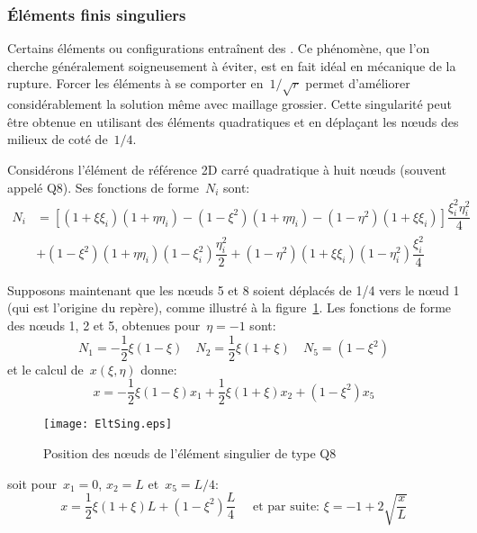 \medskip
\subsubsection{Éléments finis singuliers}
Certains éléments ou configurations entraînent des .
Ce phénomène, que l'on cherche généralement soigneusement à éviter, est en fait idéal en
mécanique de la rupture.
Forcer les éléments à se comporter en~$1/\sqrt{r}$ permet d'améliorer considérablement la solution
même avec maillage grossier.
Cette singularité peut être obtenue en utilisant des éléments quadratiques et en déplaçant
les nœuds des milieux de coté de~$1/4$.

\medskip
Considérons l'élément de référence 2D carré quadratique à huit nœuds (souvent appelé Q8).
Ses fonctions de forme~$N_i$ sont:
\begin{equation} \begin{aligned}
N_i &=\left[ (1+\xi\xi_i)(1+\eta\eta_i)-(1-\xi^2)(1+\eta\eta_i)-(1-\eta^2)(1+\xi\xi_i)\right]
\dfrac{\xi_i^2\eta_i^2}4 \\
& +
(1-\xi^2)(1+\eta\eta_i)(1-\xi_i^2)\dfrac{\eta_i^2}2 +
(1-\eta^2)(1+\xi\xi_i)(1-\eta_i^2)\dfrac{\xi_i^2}4
\end{aligned}\end{equation}

Supposons maintenant que les nœuds 5 et 8 soient déplacés de 1/4 vers le nœud 1 (qui est l'origine
du repère), comme illustré à la figure~\ref{fig-EltSing}.
Les fonctions de forme des nœuds 1, 2 et 5, obtenues pour~$\eta=-1$ sont:
\begin{equation} N_1= -\frac12\xi(1-\xi) \quad
 N_2 = \frac12\xi(1+\xi) \quad
 N_5 = (1-\xi^2)
\end{equation}
et le calcul de~$x(\xi,\eta)$ donne:
\begin{equation} x = -\frac12\xi(1-\xi)x_1 + \frac12\xi(1+\xi)x_2 + (1-\xi^2)x_5 \end{equation}
\begin{figure}[ht]\centering
\texttt{[image: EltSing.eps]}
\caption{Position des nœuds de l'élément singulier de type Q8}\label{fig-EltSing}
\end{figure}
soit pour~$x_1=0$, $x_2=L$ et~$x_5=L/4$:
\begin{equation} x = \frac12\xi(1+\xi)L + (1-\xi^2)\frac{L}4 \quad \text{ et par suite: }
\xi=-1+2\sqrt{\frac{x}L} \end{equation}

